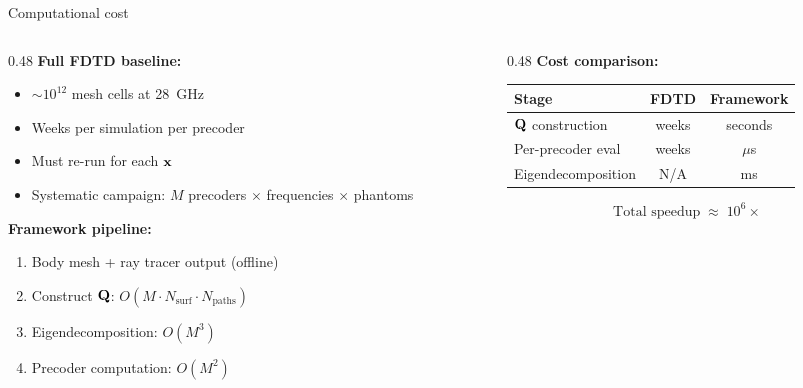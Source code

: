 \begin{frame}[label=app-p3-cost]{Computational cost}

  \begin{columns}[T]
    \begin{column}{0.48\textwidth}
      \textbf{Full FDTD baseline:}
      \begin{itemize}
        \item ${\sim}10^{12}$ mesh cells at \SI{28}{\giga\hertz}
        \item Weeks per simulation per precoder
        \item Must re-run for each $\mathbf{x}$
        \item Systematic campaign: $M$ precoders $\times$ frequencies $\times$ phantoms
      \end{itemize}

      \vspace{4pt}
      \textbf{Framework pipeline:}
      {\small
      \begin{enumerate}\setlength\itemsep{1pt}
        \item Body mesh + ray tracer output (offline)
        \item Construct $\mathbf{Q}$: $O(M \cdot N_{\mathrm{surf}} \cdot N_{\mathrm{paths}})$
        \item Eigendecomposition: $O(M^3)$
        \item Precoder computation: $O(M^2)$
      \end{enumerate}
      }
    \end{column}

    \begin{column}{0.48\textwidth}
      \textbf{Cost comparison:}

      \vspace{2pt}
      {\small
      \begin{tabular}{lcc}
        \toprule
        Stage & FDTD & Framework \\
        \midrule
        $\mathbf{Q}$ construction & weeks & seconds \\
        Per-precoder eval & weeks & $\mu$s \\
        Eigendecomposition & N/A & ms \\
        \bottomrule
      \end{tabular}
      }

      \vspace{4pt}
      \begin{resultbox}[Speedup]
        \vspace{-6pt}
        \[
          \text{Total speedup} \;\approx\; 10^6\times
        \]
        \vspace{-6pt}
      \end{resultbox}


\end{column}
\end{columns}
\end{frame}

